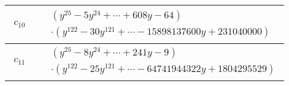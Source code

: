 \documentclass[1p]{elsarticle_modified}
\theoremstyle{definition}
\begin{document}
\begin{tabular}{m{50pt}|m{274pt}}
\hline $$\begin{aligned}c_{10}\end{aligned}$$&$\begin{aligned}
&(y^{25}-5 y^{24}+\cdots+608 y-64)\\
&\cdot(y^{122}-30 y^{121}+\cdots-15898137600 y+231040000)
\end{aligned}$\\
\hline $$\begin{aligned}c_{11}\end{aligned}$$&$\begin{aligned}
&(y^{25}-8 y^{24}+\cdots+241 y-9)\\
&\cdot(y^{122}-25 y^{121}+\cdots-64741944322 y+1804295529)
\end{aligned}$\\
\hline
\end{tabular}
\vskip 2pc
\end{document}
